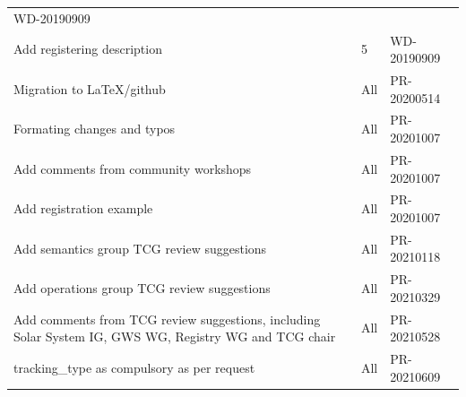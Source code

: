 \documentclass[11pt,a4paper]{ivoa}
\begin{document}
\begin{table}[H]
\begin{tabular}{p{3.75in}p{0.92in}p{0.8in}}
\multicolumn{1}{|p{0.9in}|}{{\fontsize{10pt}{12.0pt}\selectfont WD-20190909}} \\
\multicolumn{1}{|p{3.75in}}{Add registering description} &
\multicolumn{1}{|p{0.72in}}{5} &
\multicolumn{1}{|p{0.9in}|}{{\fontsize{10pt}{12.0pt}\selectfont WD-20190909}} \\
\multicolumn{1}{|p{3.75in}}{Migration to LaTeX/github} &
\multicolumn{1}{|p{0.72in}}{All} &
\multicolumn{1}{|p{0.9in}|}{{\fontsize{10pt}{12.0pt}\selectfont PR-20200514}} \\
\multicolumn{1}{|p{3.75in}}{Formating changes and typos} &
\multicolumn{1}{|p{0.72in}}{All} &
\multicolumn{1}{|p{0.9in}|}{{\fontsize{10pt}{12.0pt}\selectfont PR-20201007}} \\
\multicolumn{1}{|p{3.75in}}{Add comments from community workshops} &
\multicolumn{1}{|p{0.72in}}{All} &
\multicolumn{1}{|p{0.9in}|}{{\fontsize{10pt}{12.0pt}\selectfont PR-20201007}} \\
\multicolumn{1}{|p{3.75in}}{Add registration example} &
\multicolumn{1}{|p{0.72in}}{All} &
\multicolumn{1}{|p{0.9in}|}{{\fontsize{10pt}{12.0pt}\selectfont PR-20201007}} \\
\multicolumn{1}{|p{3.75in}}{Add semantics group TCG review suggestions} &
\multicolumn{1}{|p{0.72in}}{All} &
\multicolumn{1}{|p{0.9in}|}{{\fontsize{10pt}{12.0pt}\selectfont PR-20210118}} \\
\multicolumn{1}{|p{3.75in}}{Add operations group TCG review suggestions} &
\multicolumn{1}{|p{0.72in}}{All} &
\multicolumn{1}{|p{0.9in}|}{{\fontsize{10pt}{12.0pt}\selectfont PR-20210329}} \\
\multicolumn{1}{|p{3.75in}}{Add comments from TCG review suggestions, including
Solar System IG, GWS WG, Registry WG and TCG chair} &
\multicolumn{1}{|p{0.72in}}{All} &
\multicolumn{1}{|p{0.9in}|}{{\fontsize{10pt}{12.0pt}\selectfont PR-20210528}} \\
\multicolumn{1}{|p{3.75in}}{tracking\_type as compulsory as per request} &
\multicolumn{1}{|p{0.72in}}{All} &
\multicolumn{1}{|p{0.9in}|}{{\fontsize{10pt}{12.0pt}\selectfont PR-20210609}} \\

\hline
\end{tabular}
 \end{table}

\pagebreak

\end{document}

